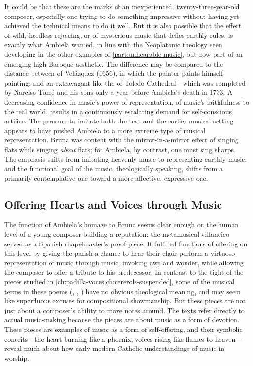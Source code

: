 It could be that these are the marks of an inexperienced, twenty-three-year-old
composer, especially one trying to do something impressive without having yet
achieved the technical means to do it well.
But it is also possible that the effect of wild, heedless rejoicing, or of
mysterious music that defies earthly rules, is exactly what Ambiela wanted, in
line with the Neoplatonic theology seen developing in the other examples of
\cref{part:unhearable-music}, but now part of an emerging high-Baroque
aesthetic.  
The difference may be compared to the distance between  of
Velázquez (1656), in which the painter paints himself painting; and an
extravagant  like the  of Toledo
Cathedral---which was completed by Narciso Tomé and his sons only a year before
Ambiela's death in 1733.
A decreasing confidence in music's power of representation, of music's
faithfulness to the real world, results in a continuously escalating demand for
self-conscious artifice.  
The pressure to imitate both the text and the earlier musical setting appears
to have pushed Ambiela to a more extreme type of musical representation.
Bruna was content with the mirror-in-a-mirror effect of singing flats while
singing \emph{about} flats; for Ambiela, by contrast, one must sing sharps.
The emphasis shifts from imitating heavenly music to representing earthly
music, and the functional goal of the music, theologically speaking, shifts
from a primarily contemplative one toward a more affective, expressive one.

\subsection{Offering Hearts and Voices through Music}

The function of Ambiela's homage to Bruna seems clear enough on the human level
of a young composer building a reputation: the metamusical villancico served as
a Spanish chapelmaster's proof piece.
It fulfilled functions of offering on this level by giving the parish a chance
to hear their choir perform a virtuoso representation of music through music,
invoking awe and wonder, while allowing the composer to offer a tribute to his
predecessor.
In contrast to the tight  of the pieces studied in
\cref{ch:padilla-voces,ch:cererols-suspended}, some of the musical terms in
these poems (, , ) have no
obvious theological meaning, and may seem like superfluous excuses for
compositional showmanship.
But these pieces are not just about a composer's ability to move notes around.
The texts refer directly to actual music-making because the pieces are about
music as a form of devotion.
These pieces are examples of music as a form of self-offering, and their
symbolic conceits---the heart burning like a phoenix, voices rising like flames
to heaven---reveal much about how early modern Catholic understandings of music
in worship.

